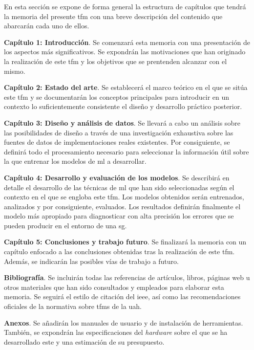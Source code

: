 En esta sección se expone de forma general la estructura de capítulos que tendrá la memoria del presente \gls{tfm} con una breve descripción del contenido que abarcarán cada uno de ellos.

\begin{description}
    \item\textbf{Capítulo 1: Introducción}. Se comenzará esta memoria con una presentación de los aspectos más significativos. Se expondrán las motivaciones que han originado la realización de este \gls{tfm} y los objetivos que se prentenden alcanzar con el mismo.

    \item\textbf{Capítulo 2: Estado del arte}. Se establecerá el marco teórico en el que se sitúa este \gls{tfm} y se documentarán los conceptos principales para introducir en un contexto lo suficientemente consistente el diseño y desarrollo práctico posterior.

    \item\textbf{Capítulo 3: Diseño y análisis de datos}. Se llevará a cabo un análisis sobre las posibilidades de diseño a través de una investigación exhaustiva sobre las fuentes de datos de implementaciones reales existentes. Por consiguiente, se definirá todo el procesamiento necesario para seleccionar la información útil sobre la que entrenar los modelos de \gls{ml} a desarrollar. 
    

    \item\textbf{Capítulo 4: Desarrollo y evaluación de los modelos}. Se describirá en detalle el desarrollo de las técnicas de \gls{ml} que han sido seleccionadas según el contexto en el que se engloba este \gls{tfm}. Los modelos obtenidos serán entrenados, analizados y por consiguiente, evaluados. Los resultados definirán finalmente el modelo más apropiado para diagnosticar con alta precisión los errores que se pueden producir en el entorno de una \gls{sg}.
    
    \item\textbf{Capítulo 5: Conclusiones y trabajo futuro}. Se finalizará la memoria con un capítulo enfocado a las conclusiones obtenidas tras la realización de este \gls{tfm}. Además, se indicarán las posibles vías de trabajo a futuro.

    \item[]\textbf{Bibliografía}. Se incluirán todas las referencias de artículos, libros, páginas web u otros materiales que han sido consultados y empleados para elaborar esta memoria. Se seguirá el estilo de citación del \gls{ieee}, así como las recomendaciones oficiales de la normativa sobre \gls{tfm}s de la \gls{uah}. 

    \item[]\textbf{Anexos}. Se añadirán los manuales de usuario y de instalación de herramientas. También, se expondrán las especificaciones del \textit{hardware} sobre el que se ha desarrollado este  y una estimación de su presupuesto.
\end{description}
